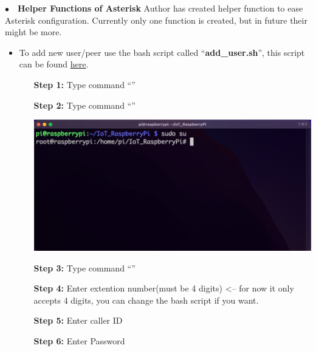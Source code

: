 \noindent$\bullet$~~\textbf{Helper Functions of Asterisk}	\label{sec:helper-asterisk}
	Author has created helper function to ease Asterisk configuration. Currently only one function is created, but in future their might be more. 
	\begin{itemize}
		\item To add new user/peer use the bash script called ``\textbf{add\_user.sh}'', this script can be found \href{https://github.com/TrupeshKumarPatel/IoT_RaspberryPi/tree/final_submission/source_code/asterisk_helper_scripts}{here}.
			\begin{itemize}[leftmargin=1.7cm]
				\item[\textbf{Step 1:}] Type command ``{\selectfont{cd IoT\_RaspberryPi}}''
				\item[\textbf{Step 2:}] Type command ``{\selectfont{sudo su}}''\\
					\begin{minipage}{\textwidth}
						\vspace{2mm}
						\includegraphics[scale=0.2]{Images/raspberry_pi/asterisk_helper/sudo.png}
						\vspace{2mm}
					\end{minipage}
				\item[\textbf{Step 3:}] Type command ``{\selectfont{bash source\_code/aste\\risk\_helper\_scripts/add\_user.sh}}''
				\item[\textbf{Step 4:}] Enter extention number(must be 4 digits) <-- for now it only accepts 4 digits, you can change the bash script if you want.
				\item[\textbf{Step 5:}] Enter caller ID
				\item[\textbf{Step 6:}] Enter Password	\\
					\begin{minipage}{\textwidth}
						\vspace{2mm}

\end{minipage}
\end{itemize}
\end{itemize}

